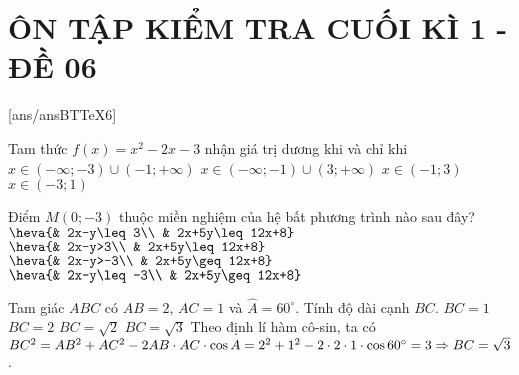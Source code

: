 ﻿\section*{ÔN TẬP KIỂM TRA CUỐI KÌ 1 - ĐỀ 06}
\setcounter{ex}{0}\setcounter{bt}{0}
[ans/ansBTTeX6]

\begin{ex}%
Tam thức $f(x)=x^2-2x-3$ nhận giá trị dương khi và chỉ khi
\choice
{$x\in (-\infty;-3)\cup (-1;+\infty)$}
{\True $x\in (-\infty;-1)\cup (3;+\infty)$}
{$x\in (-1;3)$}
{$x\in (-3;1)$}
\end{ex}

\begin{ex}%
Điểm $M\left(0;-3\right)$ thuộc miền nghiệm của hệ bất phương trình nào sau đây?
\choice
{\True $\heva{& 2x-y\leq 3\\ & 2x+5y\leq 12x+8}$}
{$\heva{& 2x-y>3\\ & 2x+5y\leq 12x+8}$}
{$\heva{& 2x-y>-3\\ & 2x+5y\geq 12x+8}$}
{$\heva{& 2x-y\leq -3\\ & 2x+5y\geq 12x+8}$}

\end{ex}

\begin{ex}%
Tam giác $ ABC$ có $ AB=2$, $AC=1$ và $ \widehat{A}=60^\circ $. Tính độ dài cạnh $ BC$.
\choice
{$ BC=1$}
{$ BC=2$}
{$ BC=\sqrt{2}$}
{\True $ BC=\sqrt{3}$}
\loigiai
{Theo định lí hàm cô-sin, ta có\\
$ BC^2=AB^2+AC^2-2AB\cdot AC\cdot \cos{A}=2^2+1^2-2\cdot 2\cdot 1\cdot \cos 60^\circ =3\\
\Rightarrow BC=\sqrt{3}$.}
\end{ex}

